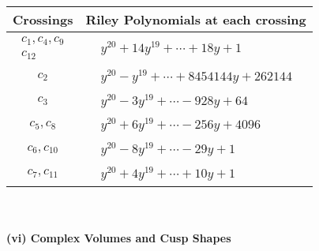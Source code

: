 \documentclass[1p]{elsarticle_modified}
\theoremstyle{definition}
\begin{document}
\begin{tabular}{m{50pt}|m{274pt}}
Crossings & \hspace{64pt}Riley Polynomials at each crossing \\
\hline $$\begin{aligned}c_{1},c_{4},c_{9}\\c_{12}\end{aligned}$$&$\begin{aligned}
&y^{20}+14 y^{19}+\cdots+18 y+1
\end{aligned}$\\
\hline $$\begin{aligned}c_{2}\end{aligned}$$&$\begin{aligned}
&y^{20}- y^{19}+\cdots+8454144 y+262144
\end{aligned}$\\
\hline $$\begin{aligned}c_{3}\end{aligned}$$&$\begin{aligned}
&y^{20}-3 y^{19}+\cdots-928 y+64
\end{aligned}$\\
\hline $$\begin{aligned}c_{5},c_{8}\end{aligned}$$&$\begin{aligned}
&y^{20}+6 y^{19}+\cdots-256 y+4096
\end{aligned}$\\
\hline $$\begin{aligned}c_{6},c_{10}\end{aligned}$$&$\begin{aligned}
&y^{20}-8 y^{19}+\cdots-29 y+1
\end{aligned}$\\
\hline $$\begin{aligned}c_{7},c_{11}\end{aligned}$$&$\begin{aligned}
&y^{20}+4 y^{19}+\cdots+10 y+1
\end{aligned}$\\
\hline
\end{tabular}\\~\\
\newpage\flushleft \textbf{(vi) Complex Volumes and Cusp Shapes}
\end{document}
